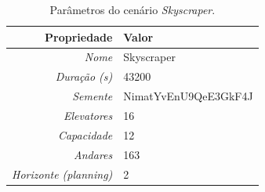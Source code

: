 \begin{table}[htb!]
\centering
\caption{Parâmetros do cenário \textit{Skyscraper}.}
\label{tab:results:skyscraper:params}
\begin{tabular}{|r|l|}
\hline
\textbf{Propriedade}          & \textbf{Valor}       \\ \hline
\textit{Nome}                 & Skyscraper           \\ \hline
\textit{Duração (s)}          & 43200                \\ \hline
\textit{Semente}              & NimatYvEnU9QeE3GkF4J \\ \hline
\textit{Elevatores}           & 16                   \\ \hline
\textit{Capacidade}           & 12                   \\ \hline
\textit{Andares}              & 163                  \\ \hline
\textit{Horizonte (planning)} & 2                    \\ \hline
\end{tabular}
\end{table}

